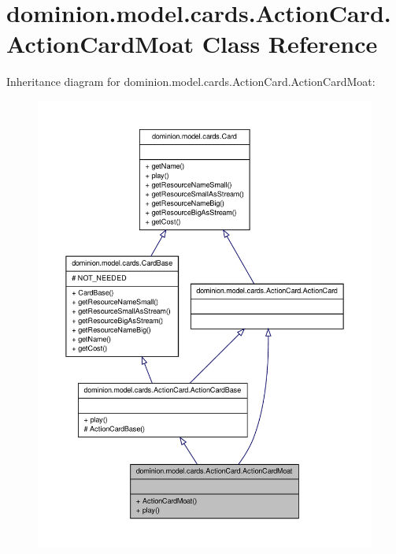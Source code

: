 \hypertarget{classdominion_1_1model_1_1cards_1_1ActionCard_1_1ActionCardMoat}{\section{dominion.\-model.\-cards.\-Action\-Card.\-Action\-Card\-Moat \-Class \-Reference}
\label{classdominion_1_1model_1_1cards_1_1ActionCard_1_1ActionCardMoat}
}


\-Inheritance diagram for dominion.\-model.\-cards.\-Action\-Card.\-Action\-Card\-Moat\-:
\nopagebreak
\begin{figure}[H]
\begin{center}
\leavevmode
\includegraphics[width=350pt]{classdominion_1_1model_1_1cards_1_1ActionCard_1_1ActionCardMoat__inherit__graph}
\end{center}
\end{figure}


